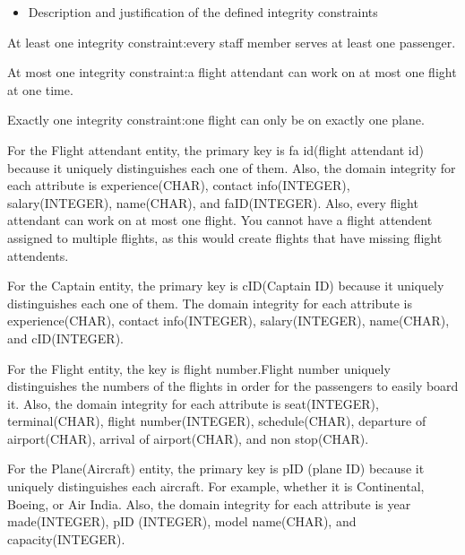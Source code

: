 \documentclass[10pt,conference]{IEEEtran}
\begin{document}
\vspace{7mm}


\begin{itemize} \item{
Description and justification of the defined integrity constraints} \end{itemize}

\textnormal{At least one integrity constraint:every staff member serves at least one passenger.}

\textnormal{At most one integrity constraint:a flight attendant can work on at most one flight at one time.}

\textnormal{Exactly one integrity constraint:one flight can only be on exactly one plane.}

\vspace{3mm}
\textnormal{For the Flight attendant entity, the primary key is fa id(flight attendant id) because it uniquely distinguishes each one of them. Also, the domain integrity for each attribute is experience(CHAR), contact info(INTEGER), salary(INTEGER), name(CHAR), and faID(INTEGER). Also, every flight attendant can work on at most one flight. You cannot have a flight attendent assigned to multiple flights, as this would create flights that have missing flight attendents.}
\vspace{3mm}

\textnormal{For the Captain entity, the primary key is cID(Captain ID) because it uniquely distinguishes each one of them. The domain integrity for each attribute is experience(CHAR), contact info(INTEGER), salary(INTEGER), name(CHAR), and cID(INTEGER).}
\vspace{3mm}

\textnormal{For the Flight entity, the key is flight number.Flight number uniquely distinguishes the numbers of the flights in order for the passengers to easily board it. Also, the domain integrity for each attribute is seat(INTEGER), terminal(CHAR), flight number(INTEGER), schedule(CHAR), departure of airport(CHAR), arrival of airport(CHAR), and non stop(CHAR).}
\vspace{3mm}

\textnormal{For the Plane(Aircraft) entity, the primary key is pID (plane ID) because it uniquely distinguishes each aircraft. For example, whether it is Continental, Boeing, or Air India. Also, the domain integrity for each attribute is year made(INTEGER), pID (INTEGER), model name(CHAR), and capacity(INTEGER).}
\vspace{3mm}
\end{document}
